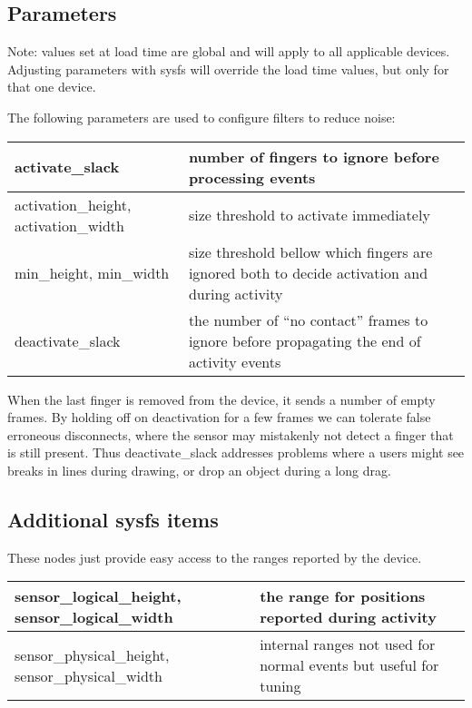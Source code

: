 \documentclass[a4paper,8pt,english]{sphinxmanual}
\begin{document}
\subsection{Parameters}
\label{input/devices/ntrig:parameters}
Note: values set at load time are global and will apply to all applicable
devices.  Adjusting parameters with sysfs will override the load time values,
but only for that one device.

The following parameters are used to configure filters to reduce noise:

\begin{tabulary}{\linewidth}{|L|L|}
\hline

activate\_slack
 & 
number of fingers to ignore before processing events
\\
\hline
activation\_height,
activation\_width
 & 
size threshold to activate immediately
\\
\hline
min\_height,
min\_width
 & 
size threshold bellow which fingers are ignored
both to decide activation and during activity
\\
\hline
deactivate\_slack
 & 
the number of ``no contact'' frames to ignore before
propagating the end of activity events
\\
\hline\end{tabulary}


When the last finger is removed from the device, it sends a number of empty
frames.  By holding off on deactivation for a few frames we can tolerate false
erroneous disconnects, where the sensor may mistakenly not detect a finger that
is still present.  Thus deactivate\_slack addresses problems where a users might
see breaks in lines during drawing, or drop an object during a long drag.


\subsection{Additional sysfs items}
\label{input/devices/ntrig:additional-sysfs-items}
These nodes just provide easy access to the ranges reported by the device.

\begin{tabulary}{\linewidth}{|L|L|}
\hline

sensor\_logical\_height,
sensor\_logical\_width
 & 
the range for positions reported during activity
\\
\hline
sensor\_physical\_height,
sensor\_physical\_width
 & 
internal ranges not used for normal events but
useful for tuning
\\
\hline\end{tabulary}
\end{document}

